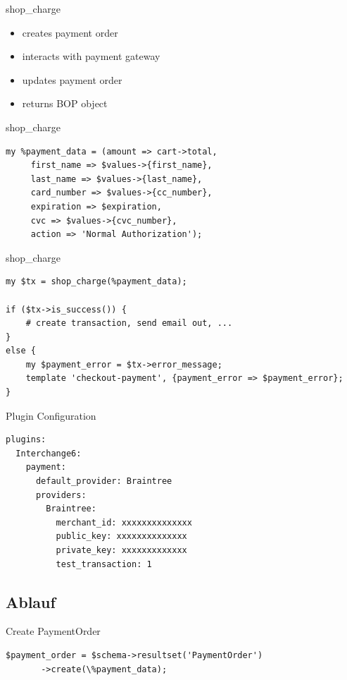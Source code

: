 \begin{frame}{shop\_charge}
\begin{itemize}
\item creates payment order
\item interacts with payment gateway
\item updates payment order
\item returns BOP object
\end{itemize}
\end{frame}

\begin{frame}[fragile]{shop\_charge}
\begin{lstlisting}
my %payment_data = (amount => cart->total,
     first_name => $values->{first_name},
     last_name => $values->{last_name},
     card_number => $values->{cc_number},
     expiration => $expiration,
     cvc => $values->{cvc_number},
     action => 'Normal Authorization');
\end{lstlisting}
\end{frame}

\begin{frame}[fragile]{shop\_charge}
\begin{lstlisting}
my $tx = shop_charge(%payment_data);

if ($tx->is_success()) {
    # create transaction, send email out, ...
}
else {
    my $payment_error = $tx->error_message;
    template 'checkout-payment', {payment_error => $payment_error};
}
\end{lstlisting}
\end{frame}

\begin{frame}[fragile]{Plugin Configuration}
\begin{lstlisting}
plugins:
  Interchange6:
    payment:
      default_provider: Braintree
      providers:
        Braintree:
          merchant_id: xxxxxxxxxxxxxx
          public_key: xxxxxxxxxxxxxx
          private_key: xxxxxxxxxxxxx
          test_transaction: 1
\end{lstlisting}
\end{frame}

\subsection{Ablauf}
\begin{frame}[fragile]{Create PaymentOrder}
\begin{lstlisting}
$payment_order = $schema->resultset('PaymentOrder')
       ->create(\%payment_data);
\end{lstlisting}
\end{frame}

